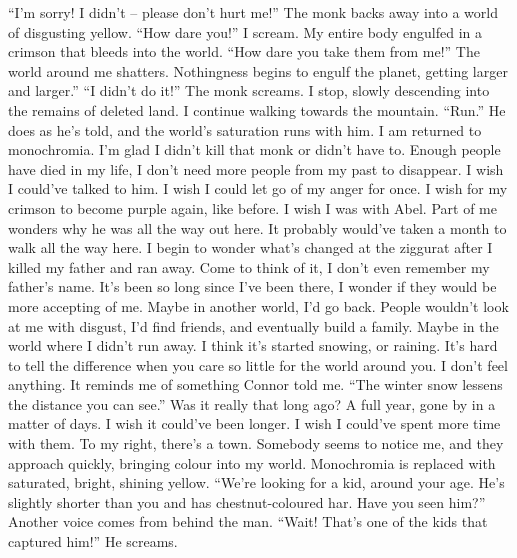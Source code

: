 \documentclass[openany, 12pt]{book}
\newcommand\tab[1][1cm]{\hspace*{#1}}
\begin{document}
\newline
\tab
``I’m sorry! I didn’t -- please don’t hurt me!'' The monk backs away into a world of disgusting yellow.
\newline
\tab
``How dare you!'' I scream. My entire body engulfed in a crimson that bleeds into the world. ``How dare you take them from me!'' The world around me shatters. Nothingness begins to engulf the planet, getting larger and larger.''
\newline
\tab
``I didn’t do it!'' The monk screams. I stop, slowly descending into the remains of deleted land. I continue walking towards the mountain.
\newline
\tab
``Run.'' He does as he’s told, and the world’s saturation runs with him. I am returned to monochromia. 
\newline
\tab
I’m glad I didn’t kill that monk or didn’t have to. Enough people have died in my life, I don’t need more people from my past to disappear. I wish I could’ve talked to him. I wish I could let go of my anger for once. I wish for my crimson to become purple again, like before. I wish I was with Abel.
\newline
\tab
Part of me wonders why he was all the way out here. It probably would’ve taken a month to walk all the way here. I begin to wonder what’s changed at the ziggurat after I killed my father and ran away. Come to think of it, I don’t even remember my father’s name. It’s been so long since I’ve been there, I wonder if they would be more accepting of me. Maybe in another world, I’d go back. People wouldn’t look at me with disgust, I’d find friends, and eventually build a family. Maybe in the world where I didn’t run away.
\newline
\tab
I think it’s started snowing, or raining. It’s hard to tell the difference when you care so little for the world around you. I don’t feel anything. It reminds me of something Connor told me. ``The winter snow lessens the distance you can see.'' Was it really that long ago? A full year, gone by in a matter of days. I wish it could’ve been longer. I wish I could’ve spent more time with them.
\newline
\tab
To my right, there’s a town. Somebody seems to notice me, and they approach quickly, bringing colour into my world. Monochromia is replaced with saturated, bright, shining yellow.  ``We’re looking for a kid, around your age. He’s slightly shorter than you and has chestnut-coloured har. Have you seen him?''
\newline
\tab
Another voice comes from behind the man. ``Wait! That’s one of the kids that captured him!'' He screams.
\end{document}
